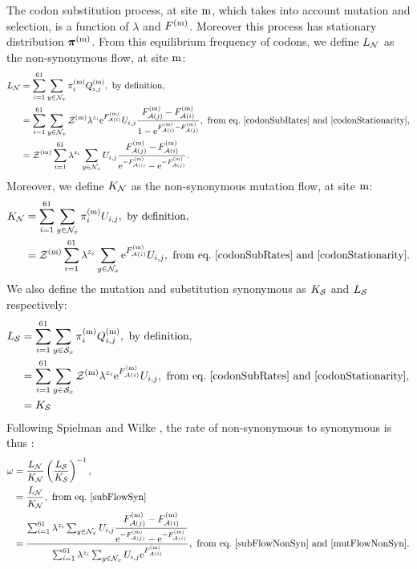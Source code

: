The \gls{codon} \gls{substitution} process, at site $\text{m}$, which takes into account mutation and selection, is a function of $\lambda$ and $F^{(\text{m})}$.
Moreover this process has stationary distribution $\bm{\pi}^{(\text{m})}$.
From this equilibrium frequency of \glspl{codon}, we define $L_{\mathcal{N}}$ as the \gls{non-synonymous} flow, at site $\text{m}$:
\begin{align}
    L_{\NonSyn}
    & = \sum_{\ci=1}^{61} \sum_{y \in \NxNonSyn}  \subequi_{\ci}\siteexp \submatrix_{\itoj}\siteexp, \ \textrm{by definition},\\
    & = \sum_{\ci=1}^{61} \sum_{y \in \NxNonSyn} \mathcal{Z}\siteexp \lambda^{\nbrWeak_{\ci}} \e^{\Fiti\siteexp} U_{\itoj} \dfrac{\Fitj\siteexp - \Fiti\siteexp}{1 - \e^{\Fiti\siteexp - \Fitj\siteexp}}, \ \textrm{from eq.}\ \ref{codonSubRates} \ \text{and} \ \ref{codonStationarity},\\
    & = \mathcal{Z}\siteexp \sum_{\ci=1}^{61} \lambda^{\nbrWeak_{\ci}} \sum_{y \in \NxNonSyn}  U_{\itoj} \dfrac{\Fitj\siteexp - \Fiti\siteexp}{\e^{-\Fiti\siteexp} - \e^{ - \Fitj\siteexp}}.
    \label{subFlowNonSyn}
\end{align}
Moreover, we define $K_{\mathcal{N}}$ as the non-synonymous mutation flow, at site $\text{m}$:
\begin{align}
    K_{\NonSyn}
    & = \sum_{\ci=1}^{61} \sum_{y \in \NxNonSyn}  \subequi_{\ci}\siteexp U_{\itoj}, \ \textrm{by definition},\\
    & = \mathcal{Z}\siteexp  \sum_{\ci=1}^{61} \lambda^{\nbrWeak_{\ci}} \sum_{y \in \NxNonSyn} \e^{\Fiti\siteexp} U_{\itoj}, \ \textrm{from eq.}\ \ref{codonSubRates} \ \text{and} \ \ref{codonStationarity}.
    \label{mutFlowNonSyn}
\end{align}
We also define the mutation and \gls{substitution} synonymous as $K_{\mathcal{S}}$ and $L_{\mathcal{S}}$ respectively:
\begin{align}
    L_{\mathcal{S}}
    & =  \sum_{{i}=1}^{61} \sum_{y \in \mathcal{S}_x}  \pi_{{i}}^{(\text{m})} Q_{{i}, {j}}^{(\text{m})}, \ \textrm{by definition},\\
    & = \sum_{{i}=1}^{61} \sum_{y \in \mathcal{S}_x} \mathcal{Z}^{(\text{m})} \lambda^{{z}_{{i}}} \mathrm{e}^{F_{\mathcal{A}({i})}^{(\text{m})}} U_{{i}, {j}}, \ \textrm{from eq.}\ \ref{codonSubRates} \ \text{and} \ \ref{codonStationarity}, \\
    & = K_{\mathcal{S}}
    \label{subFlowSyn}
\end{align}
Following Spielman and Wilke \citep{Spielman2015}, the rate of non-synonymous to \gls{synonymous} is thus :
\begin{align}
    \omega
    & = \dfrac{L_{\NonSyn}}{K_{\NonSyn}}  \left( \dfrac{L_{\Syn}}{K_{\Syn}}  \right)^{-1}, \\
    & = \dfrac{L_{\NonSyn}}{K_{\NonSyn}}, \ \textrm{from eq.}\ \ref{subFlowSyn} \\
    & = \dfrac{ \sum_{\ci=1}^{61} \lambda^{\nbrWeak_{\ci}} \sum_{y \in \NxNonSyn}  U_{\itoj} \dfrac{\Fitj\siteexp - \Fiti\siteexp}{\e^{ - \Fitj\siteexp} -  \e^{- \Fiti\siteexp} } }{ \sum_{\ci=1}^{61}  \lambda^{\nbrWeak_{\ci}} \sum_{y \in \NxNonSyn} U_{\itoj} \e^{\Fiti\siteexp} }, \ \textrm{from eq.}\ \ref{subFlowNonSyn} \ \text{and} \ \ref{mutFlowNonSyn}.
    \label{omegaSite}
\end{align}
